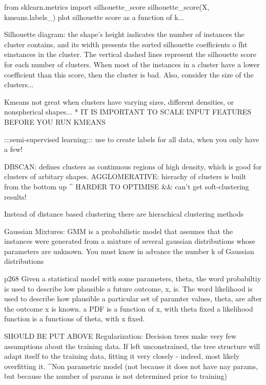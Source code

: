 from sklearn.metrics import silhouette_score
silhouette_score(X, kmeans.labels_)
plot silhouette score as a function of k...

Silhouette diagram:
the shape's height indicates the number of instances
the cluster contains, and its width presents the sorted silhouette coefficients o fht einstances in the cluster.
The vertical dashed lines represent the silhouette score for each number of clusters.
When most of the instances in a cluster have a lower coefficient than this score,
then the cluster is bad.
Also, consider the size of the clusters...

Kmeans not great when clusters have varying sizes,
different densities,
or nonspherical shapes...
* IT IS IMPORTANT TO SCALE INPUT FEATURES BEFORE YOU RUN KMEANS

:::semi-supervised learning:::
use to create labels for all data, when you only have a few!

DBSCAN: defines clusters as continuous regions of high density, which is good for clusters of arbitary shapes.
AGGLOMERATIVE: hierachy of clusters is built from the bottom up
^ HARDER TO OPTIMISE
&& can't get soft-clustering results!

Instead of distance based clustering
there are hierachical clustering methods


Gaussian Mixtures:
GMM is a probabilistic model that assumes that the instances were generated from a mixture of several gaussian distributions
whose parameters are unknown.
You must know in advance the number k of Gaussian distributions

p268
Given a statistical model with some parameters, theta, the word probabiltiy is used to describe low plausible a future outcome, x, is.
The word likelihood is used to describe how plausible a particular set of paramter values, theta, are after the outcome x is known.
a PDF is a function of x, with theta fixed
a likelihood function is a functions of theta, with x fixed.







SHOULD BE PUT ABOVE Regularization:
Decision trees make very few assumptions about the training data.
If left unconstrained,
the tree structure will adapt itself to the training data,
fitting it very closely - indeed, most likely overfitting it.
^Non parametric model
(not because it does not have nay params,
but because the number of params is not determined prior to training)


